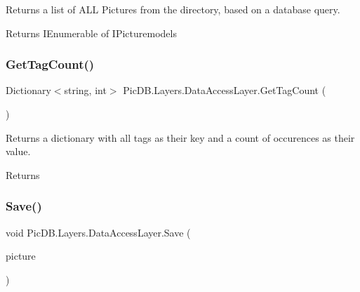 Returns a list of A\+LL Pictures from the directory, based on a database query. 

\begin{DoxyReturn}{Returns}
I\+Enumerable of I\+Picturemodels
\end{DoxyReturn}
\mbox{\label{class_pic_d_b_1_1_layers_1_1_data_access_layer_aa66634d35385c5d84a28352d859833bc}} 
\subsubsection{\texorpdfstring{Get\+Tag\+Count()}{GetTagCount()}}
{\footnotesize\ttfamily Dictionary$<$string, int$>$ Pic\+D\+B.\+Layers.\+Data\+Access\+Layer.\+Get\+Tag\+Count (\begin{DoxyParamCaption}{ }\end{DoxyParamCaption})}



Returns a dictionary with all tags as their key and a count of occurences as their value. 

\begin{DoxyReturn}{Returns}

\end{DoxyReturn}
\mbox{\label{class_pic_d_b_1_1_layers_1_1_data_access_layer_a7fd40a4ce08e73fa15fd964138d95f20}} 
\subsubsection{\texorpdfstring{Save()}{Save()}\hspace{0.1cm}{\footnotesize\ttfamily [1/2]}}
{\footnotesize\ttfamily void Pic\+D\+B.\+Layers.\+Data\+Access\+Layer.\+Save (\begin{DoxyParamCaption}\item[{I\+Picture\+Model}]{picture }\end{DoxyParamCaption})}




